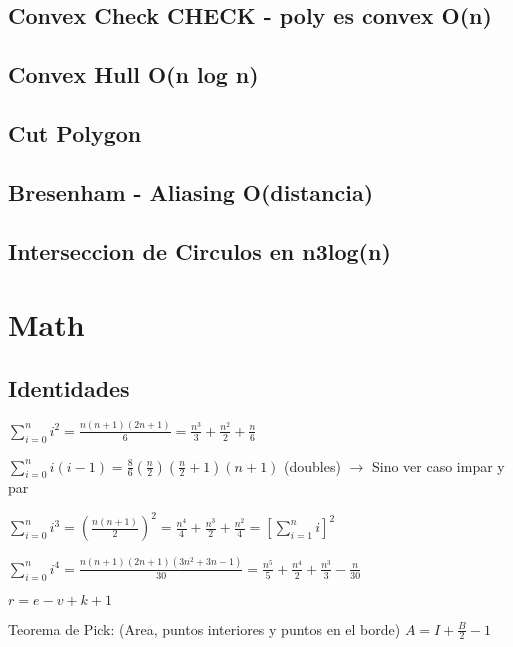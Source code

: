 \subsection{Convex Check CHECK - poly es convex O(n)}
\subsection{Convex Hull O(n log n)}
\subsection{Cut Polygon}
\subsection{Bresenham - Aliasing O(distancia)} %
\subsection{Interseccion de Circulos en n3log(n)}


\section{Math}%
\subsection{Identidades}
{




$\sum_{i=0}^n i^2 = \frac{n(n+1)(2n+1)}{6} = \frac{n^3}{3} + \frac{n^2}{2} + \frac{n}{6}$

$\sum_{i=0}^n i(i-1) = \frac{8}{6}(\frac{n}{2})(\frac{n}{2}+1)(n+1)$ (doubles) $\rightarrow$ Sino ver caso impar y par

$\sum_{i=0}^n i^3 = \left(\frac{n(n+1)}{2}\right)^2 = \frac{n^4}{4} + \frac{n^3}{2} + \frac{n^2}{4} = \left[\sum_{i=1}^n i\right]^2$

$\sum_{i=0}^n i^4 = \frac{n(n+1)(2n+1)(3n^2+3n-1)}{30} = \frac{n^5}{5} + \frac{n^4}{2} + \frac{n^3}{3} - \frac{n}{30}$


$r=e-v+k+1$

Teorema de Pick: (Area, puntos interiores y puntos en el borde) $A=I+\frac{B}{2}-1$


}%

